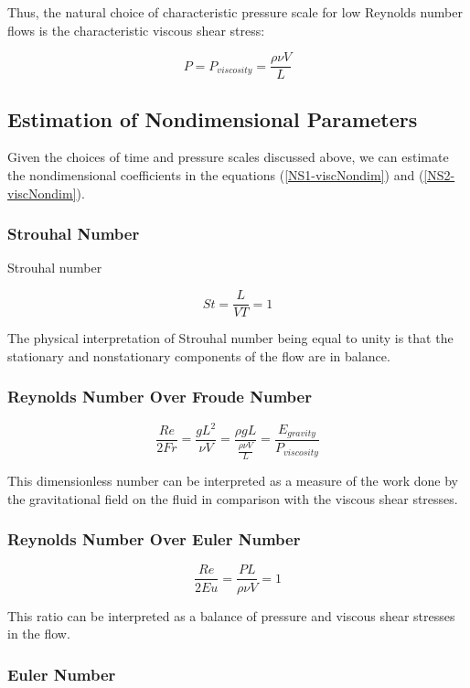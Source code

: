 Thus, the natural choice of characteristic pressure scale for low Reynolds number flows is the characteristic viscous shear stress:

$$ P = P_{viscosity} = \frac{\rho \nu V}{L} $$

\subsection{Estimation of Nondimensional Parameters} \label{stokes_parameters}

Given the choices of time and pressure scales discussed above, we can estimate the nondimensional coefficients in the equations (\ref{NS1-viscNondim}) and (\ref{NS2-viscNondim}).

\subsubsection{Strouhal Number}

Strouhal number 

$$ St = \frac{L}{VT} = 1 $$ 

The physical interpretation of Strouhal number being equal to unity is that the stationary and nonstationary components of the flow are in balance.

\subsubsection{Reynolds Number Over Froude Number}

$$ \frac{Re}{2Fr} = \frac{gL^2}{\nu V} = \frac{\rho gL}{\frac{\rho \nu V}{L}} = \frac{E_{gravity}}{P_{viscosity}} $$

This dimensionless number can be interpreted as a measure of the work done by the gravitational field on the fluid in comparison with the viscous shear stresses.

\subsubsection{Reynolds Number Over Euler Number}

$$ \frac{Re}{2Eu} = \frac{PL}{\rho \nu V} = 1 $$

This ratio can be interpreted as a balance of pressure and viscous shear stresses in the flow.

\subsubsection{Euler Number}

